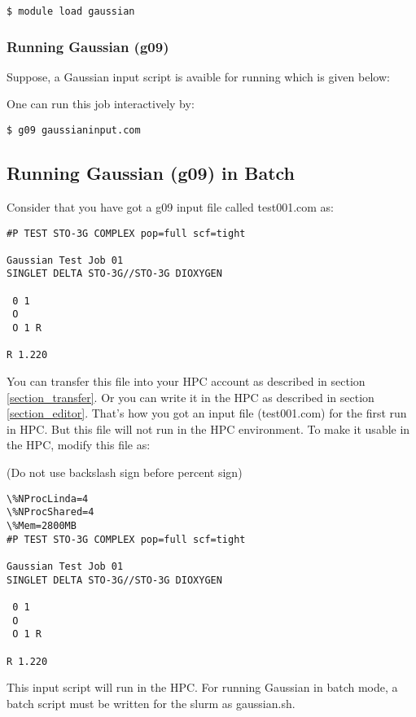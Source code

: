 \documentclass[11pt]{article}
\numberwithin{figure}{section}
\begin{document}
\begin{lstlisting}[frame=single]
$ module load gaussian
\end{lstlisting}

\subsubsection{Running Gaussian (g09)}
Suppose, a Gaussian input script is avaible for running which is given below:

One can run this job interactively by:

\begin{lstlisting}[frame=single]
$ g09 gaussianinput.com
\end{lstlisting}

\subsection{Running Gaussian (g09) in Batch}
Consider that you have got a g09 input file called test001.com as:

\begin{lstlisting}[frame=single]
#P TEST STO-3G COMPLEX pop=full scf=tight

Gaussian Test Job 01
SINGLET DELTA STO-3G//STO-3G DIOXYGEN

 0 1
 O
 O 1 R

R 1.220

\end{lstlisting}

You can transfer this file into your HPC account as described in section
\ref{section_transfer}. Or you can write it in the HPC as described in section
\ref{section_editor}. That's how you got an input file (test001.com) for the first run
in HPC. But this file will not run in the HPC environment. To make it usable in
the HPC, modify this file as:

(Do not use backslash sign before percent sign)
\begin{lstlisting}[frame=single]
\%NProcLinda=4
\%NProcShared=4
\%Mem=2800MB
#P TEST STO-3G COMPLEX pop=full scf=tight

Gaussian Test Job 01
SINGLET DELTA STO-3G//STO-3G DIOXYGEN

 0 1
 O
 O 1 R

R 1.220
\end{lstlisting}

This input script will run in the HPC.
For running Gaussian in batch mode, a batch script must be written for the
slurm as gaussian.sh.
\end{document}
